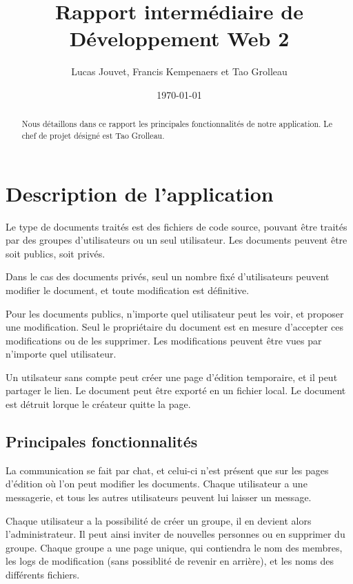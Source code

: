 \documentclass[a4paper, 12pt]{article}
\title{Rapport intermédiaire de Développement Web 2}
\author{Lucas Jouvet, Francis Kempenaers et Tao Grolleau}
\date{\today}
\begin{document}
\maketitle

\begin{abstract}
  Nous détaillons dans ce rapport les principales fonctionnalités de notre application. Le chef de projet désigné est Tao Grolleau.
\end{abstract}

\newpage

\section{Description de l'application}

Le type de documents traités est des fichiers de code source, pouvant être traités par des groupes d'utilisateurs ou un seul utilisateur. Les documents peuvent être soit publics, soit privés. 

Dans le cas des documents privés, seul un nombre fixé d'utilisateurs peuvent modifier le document, et toute modification est définitive. 

Pour les documents publics, n'importe quel utilisateur peut les voir, et proposer une modification. Seul le propriétaire du document est en mesure d'accepter ces modifications ou de les supprimer. Les modifications peuvent être vues par n'importe quel utilisateur.

Un utilsateur sans compte peut créer une page d'édition temporaire, et il peut partager le lien. Le document peut être exporté en un fichier local. Le document est détruit lorque le créateur quitte la page.

\subsection{Principales fonctionnalités}

La communication se fait par chat, et celui-ci n'est présent que sur les pages d'édition où l'on peut modifier les documents. Chaque utilisateur a une messagerie, et tous les autres utilisateurs peuvent lui laisser un message.

Chaque utilisateur a la possibilité de créer un groupe, il en devient alors l'administrateur. Il peut ainsi inviter de nouvelles personnes ou en supprimer du groupe. Chaque groupe a une page unique, qui contiendra le nom des membres, les logs de modification (sans possiblité de revenir en arrière), et les noms des différents fichiers.
\end{document}
